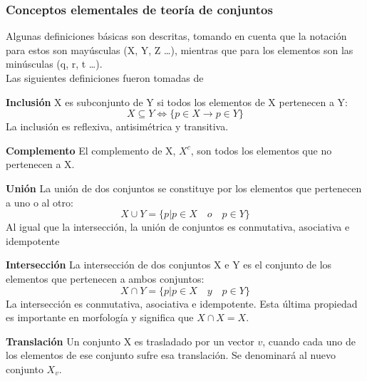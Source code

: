 \subsubsection{Conceptos elementales de teoría de conjuntos}
Algunas definiciones básicas son descritas, tomando en cuenta que la notación para estos son mayúsculas (X, Y, Z \dots), mientras
que para los elementos son las minúsculas (q, r, t \dots).\\
Las siguientes definiciones fueron tomadas de \cite{10045_10053}
\theoremstyle{definition}
\begin{definition}{\textbf{Inclusión}}
	X es subconjunto de Y si todos los elementos de X pertenecen a Y:
	\begin{equation}
		X \subseteq Y 	\iff \{ p \in X \rightarrow p \in Y \}
	\end{equation}
	La inclusión es reflexiva, antisimétrica y transitiva.
\end{definition}
\begin{definition}{\textbf{Complemento}}
	El complemento de X, $X^c$, son todos los elementos que no pertenecen a X.
\end{definition}
\begin{definition}{\textbf{Unión}}
	La unión de dos conjuntos se constituye por los elementos que pertenecen a uno o al otro:
	\begin{equation}
		X \cup Y = \{ p|p \in X \quad o  \quad p \in Y \}
	\end{equation}
	Al igual que la intersección, la unión de conjuntos es conmutativa, asociativa e idempotente
\end{definition}
\begin{definition}{\textbf{Intersección}}
	La intersección de dos conjuntos X e Y es el conjunto de los elementos que pertenecen a ambos conjuntos:
	\begin{equation}
		X \cap Y = \{ p|p \in X \quad y \quad p \in Y \}
	\end{equation}
	La intersección es conmutativa, asociativa e idempotente. Esta última propiedad es importante en morfología y
	significa que $X \cap X = X$.
\end{definition}
\begin{definition}{\textbf{Translación}}
	Un conjunto X es trasladado por un vector $v$, cuando cada uno de los elementos de ese conjunto sufre esa translación.
	Se denominará al nuevo conjunto $X_v$.
\end{definition}

